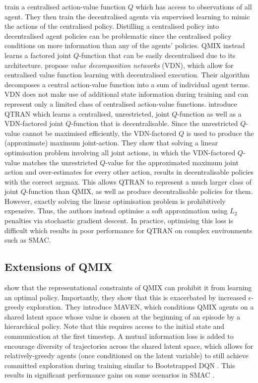 \documentclass[twoside,11pt]{article}
\begin{document}
\citet{lin2019cesma} train a centralised action-value function $Q$ which has access to observations of all agent. They then train the decentralised agents via supervised learning to mimic the actions of the centralised policy. Distilling a centralised policy into decentralised agent policies can be problematic since the centralised policy conditions on more information than any of the agents' policies. QMIX instead learns a factored joint $Q$-function that can be easily decentralised due to its architecture.  
\citet{sunehag_value-decomposition_2017} propose \emph{value decomposition 
	networks} (VDN), which allow for centralised value function learning with 
decentralised execution. Their algorithm decomposes a central 
action-value function into a sum of individual agent terms. 
VDN does not make 
use of additional state information during training and can represent only a
limited class of centralised action-value functions.
\citet{son_qtran:_2019} introduce QTRAN which learns a centralised, unrestricted, joint $Q$-function as well as a VDN-factored joint $Q$-function that is decentralisable. 
Since the unrestricted $Q$-value cannot be maximised efficiently, the VDN-factored $Q$ is used to produce the (approximate) maximum joint-action. 
They show that solving a linear optimisation problem involving all joint actions, in which the VDN-factored $Q$-value matches the unrestricted $Q$-value for the approximated maximum joint action and over-estimates for every other action, results in decentralisable policies with the correct argmax.
This allows QTRAN to represent a much larger class of joint $Q$-function than QMIX, as well as produce decentralisable policies for them.
However, exactly solving the linear optimisation problem is prohibitively expensive. Thus, the authors instead optimise a soft approximation using $L_2$ penalties via stochastic gradient descent.
In practice, optimising this loss is difficult which results in poor performance for QTRAN on complex environments such as SMAC.

\subsection{Extensions of QMIX}
\label{sec:rw_qmix}

\citet{mahajan_maven:_2019} show that the representational constraints of QMIX can prohibit it from learning an optimal policy. 
Importantly, they show that this is exacerbated by increased $\epsilon$-greedy exploration.
They introduce MAVEN, which conditions QMIX agents on a shared latent space whose value is chosen at the beginning of an episode by a hierarchical policy. Note that this requires access to the initial state and communication at the first timestep.
A mutual information loss is added to encourage diversity of trajectories across the shared latent space, which allows for relatively-greedy agents (once conditioned on the latent variable) to still achieve committed exploration during training similar to Bootstrapped DQN \citep{osband2016deep}.
This results in significant performance gains on some scenarios in SMAC \citep{samvelyan2019starcraft}.
\end{document}
